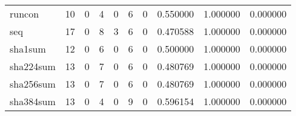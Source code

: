 \begin{longtable}{lrrrrrrrrr}
runcon    &                                       10 &                                                  0 &                                                  4 &                                                  0 &                                                  6 &                                                  0 &                                           0.550000 &                               1.000000 &                             0.000000 \\
seq       &                                       17 &                                                  0 &                                                  8 &                                                  3 &                                                  6 &                                                  0 &                                           0.470588 &                               1.000000 &                             0.000000 \\
sha1sum   &                                       12 &                                                  0 &                                                  6 &                                                  0 &                                                  6 &                                                  0 &                                           0.500000 &                               1.000000 &                             0.000000 \\
sha224sum &                                       13 &                                                  0 &                                                  7 &                                                  0 &                                                  6 &                                                  0 &                                           0.480769 &                               1.000000 &                             0.000000 \\
sha256sum &                                       13 &                                                  0 &                                                  7 &                                                  0 &                                                  6 &                                                  0 &                                           0.480769 &                               1.000000 &                             0.000000 \\
sha384sum &                                       13 &                                                  0 &                                                  4 &                                                  0 &                                                  9 &                                                  0 &                                           0.596154 &                               1.000000 &                             0.000000 \\

\end{longtable}
